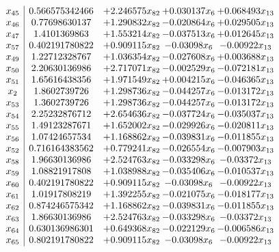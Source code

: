 \documentclass[11pt]{article}
\begin{document}
\[\begin{array}{c| c c@{\hskip 2pt} c@{\hskip 2pt} c@{\hskip 2pt} }
 x_{45}   &  0.566575342466 & + 2.246575 x_{82} & + 0.030137 x_{6} & + 0.068493 x_{13}\\
 x_{46}   &  0.77698630137 & + 1.290832 x_{82} & -0.020864 x_{6} & + 0.029505 x_{13}\\
 x_{47}   &  1.4101369863 & + 1.553214 x_{82} & -0.037513 x_{6} & + 0.012645 x_{13}\\
 x_{57}   &  0.402191780822 & + 0.909115 x_{82} & -0.03098 x_{6} & -0.00922 x_{13}\\
 x_{49}   &  1.22712328767 & + 1.036354 x_{82} & -0.027608 x_{6} & + 0.003688 x_{13}\\
 x_{50}   &  2.20630136986 & + 2.717071 x_{82} & -0.002529 x_{6} & -0.072181 x_{13}\\
 x_{51}   &  1.65616438356 & + 1.971549 x_{82} & + 0.004215 x_{6} & -0.046365 x_{13}\\
 x_{2}   &  1.8602739726 & + 1.298736 x_{82} & -0.044257 x_{6} & -0.013172 x_{13}\\
 x_{53}   &  1.3602739726 & + 1.298736 x_{82} & -0.044257 x_{6} & -0.013172 x_{13}\\
 x_{54}   &  2.25232876712 & + 2.654636 x_{82} & -0.037724 x_{6} & -0.035037 x_{13}\\
 x_{55}   &  1.49123287671 & + 1.652002 x_{82} & -0.029926 x_{6} & -0.020811 x_{13}\\
 x_{56}   &  1.07424657534 & + 1.168862 x_{82} & -0.039831 x_{6} & -0.011855 x_{13}\\
 x_{52}   &  0.716164383562 & + 0.779241 x_{82} & -0.026554 x_{6} & -0.007903 x_{13}\\
 x_{58}   &  1.96630136986 & + 2.524763 x_{82} & -0.033298 x_{6} & -0.03372 x_{13}\\
 x_{59}   &  1.08821917808 & + 1.038988 x_{82} & -0.035406 x_{6} & -0.010537 x_{13}\\
 x_{60}   &  0.402191780822 & + 0.909115 x_{82} & -0.03098 x_{6} & -0.00922 x_{13}\\
 x_{61}   &  1.01917808219 & + 1.392255 x_{82} & -0.021075 x_{6} & -0.018177 x_{13}\\
 x_{62}   &  0.874246575342 & + 1.168862 x_{82} & -0.039831 x_{6} & -0.011855 x_{13}\\
 x_{63}   &  1.86630136986 & + 2.524763 x_{82} & -0.033298 x_{6} & -0.03372 x_{13}\\
 x_{64}   &  0.630136986301 & + 0.649368 x_{82} & -0.022129 x_{6} & -0.006586 x_{13}\\
 x_{65}   &  0.802191780822 & + 0.909115 x_{82} & -0.03098 x_{6} & -0.00922 x_{13}\\

\end{array}\]
\end{document}
